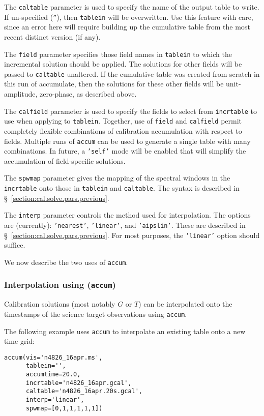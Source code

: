 {The {\tt caltable} parameter is used to specify the name of the output
table to write. If un-specified ({\tt ''}), then {\tt tablein} will be
overwritten. Use this feature with care, since an error here will
require building up the cumulative table from the most recent distinct
version (if any).

The {\tt field} parameter specifies those field names in {\tt tablein} to
which the incremental solution should be applied. The solutions for
other fields will be passed to {\tt caltable} unaltered. If the cumulative
table was created from scratch in this run of accumulate, then the
solutions for these other fields will be unit-amplitude, zero-phase,
as described above.

The {\tt calfield} parameter is used to specify the fields to select
from {\tt incrtable} to use when applying to {\tt tablein}. Together,
use of {\tt field} and {\tt calfield} permit completely flexible combinations
of calibration accumulation with respect to fields. Multiple runs of
{\tt accum} can be used to generate a single table with many combinations.
In future, a {\tt 'self'} mode will be enabled that will simplify the
accumulation of field-specific solutions.

The {\tt spwmap} parameter gives the mapping of the spectral windows
in the {\tt incrtable} onto those in {\tt tablein} and {\tt caltable}.
The syntax is described in \S~\ref{section:cal.solve.pars.previous}.

The {\tt interp} parameter controls the method used for interpolation.
The options are (currently): {\tt 'nearest'}, {\tt 'linear'}, and
{\tt 'aipslin'}.
These are described in \S~\ref{section:cal.solve.pars.previous}.
For most purposes, the {\tt 'linear'} option should suffice.

We now describe the two uses of {\tt accum}.

\subsubsection{Interpolation using ({\tt accum})}
\label{section:cal.tables.accum.interp}

Calibration solutions (most notably $G$ or $T$) can be interpolated
onto the timestamps of the science target observations using {\tt accum}.  

The following example uses {\tt accum} to interpolate an existing
table onto a new time grid:
\small
\begin{verbatim}
accum(vis='n4826_16apr.ms',
      tablein='',
      accumtime=20.0,
      incrtable='n4826_16apr.gcal',
      caltable='n4826_16apr.20s.gcal',
      interp='linear',
      spwmap=[0,1,1,1,1,1])


\end{verbatim}}
